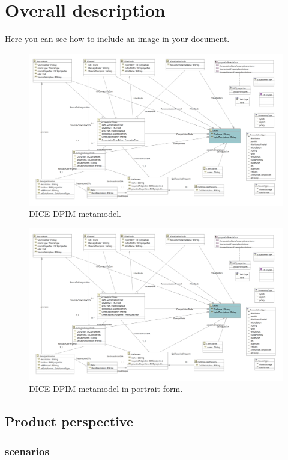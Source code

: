 \section{Overall description}
Here you can see how to include an image in your document.

\begin{figure}
\centering
\includegraphics[width=\textwidth]{Images/11.png}
\caption{\label{fig:metamodel}DICE DPIM metamodel.}
\end{figure}

\begin{figure}
\centering
\includegraphics[width=\textwidth]{Images/11.png}
\caption{\label{fig:metamodel2}DICE DPIM metamodel in portrait form.}
\end{figure}

\subsection{Product perspective}
\subsubsection{scenarios}
